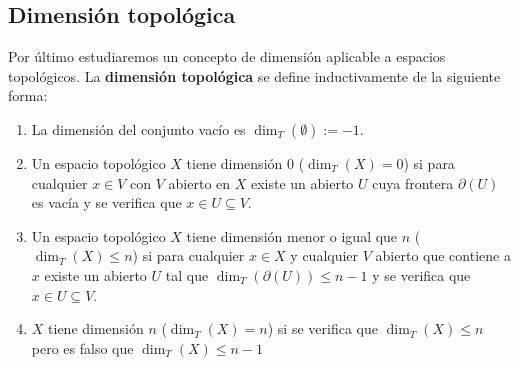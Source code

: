 \subsection{Dimensión topológica}

Por último estudiaremos un concepto de dimensión aplicable a espacios topológicos. La \textbf{dimensión topológica} se define inductivamente de la siguiente forma:

\begin{enumerate}
\item La dimensión del conjunto vacío es $\dim_T(\emptyset):=-1$.
\item Un espacio topológico $X$ tiene dimensión 0 ($\dim_T(X)=0$) si para cualquier $x\in V$ con $V$ abierto en $X$ existe un abierto $U$ cuya frontera $\partial(U)$ es vacía y se verifica que $x\in U\subseteq V$.

\item Un espacio topológico $X$ tiene dimensión menor o igual que $n$ ($\dim_T(X)\leq n$) si para cualquier $x\in X$ y cualquier $V$ abierto que contiene a $x$ existe un abierto $U$ tal que $\dim_T(\partial(U))\leq n-1$ y se verifica que $x\in U\subseteq V$. 

\item $X$ tiene dimensión $n$ ($\dim_T(X)=n$) si se verifica que $\dim_T(X)\leq n$ pero es falso que $\dim_T(X)\leq n-1$
\end{enumerate}

